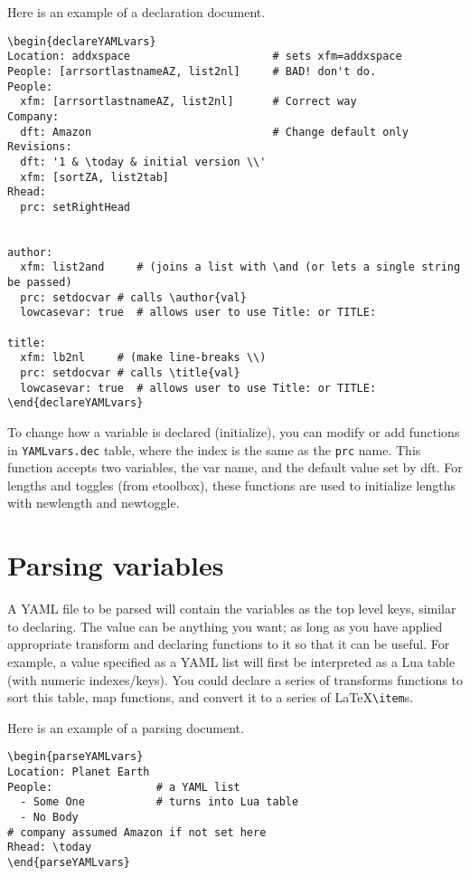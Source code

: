 \documentclass[11pt,parskip=half]{scrartcl}
\begin{document}
Here is an example of a declaration document.
\begin{verbatim}
\begin{declareYAMLvars}
Location: addxspace                      # sets xfm=addxspace
People: [arrsortlastnameAZ, list2nl]     # BAD! don't do.
People:
  xfm: [arrsortlastnameAZ, list2nl]      # Correct way
Company:
  dft: Amazon                            # Change default only
Revisions:
  dft: '1 & \today & initial version \\'
  xfm: [sortZA, list2tab]
Rhead:
  prc: setRightHead


author:
  xfm: list2and     # (joins a list with \and (or lets a single string be passed)
  prc: setdocvar # calls \author{val}
  lowcasevar: true  # allows user to use Title: or TITLE:
  
title:
  xfm: lb2nl     # (make line-breaks \\)
  prc: setdocvar # calls \title{val}
  lowcasevar: true  # allows user to use Title: or TITLE:
\end{declareYAMLvars}
\end{verbatim}


To change how a variable is declared (initialize), you can modify or add functions in
\texttt{YAMLvars.dec} table, where the index is the same as the \texttt{prc} name. 
This function accepts two variables, the var name, and the default value set by dft.
For lengths and toggles (from etoolbox), these functions are used to initialize lengths
with newlength and newtoggle.


\section{Parsing variables}
A YAML file to be parsed will contain the variables as the top level keys, similar to declaring.
The value can be anything you want; as long as you have applied appropriate transform and declaring
functions to it so that it can be useful. For example, a value specified as a YAML list will first be
interpreted as a Lua table (with numeric indexes/keys). You could declare a series of transforms functions
to sort this table, map functions, and convert it to a series of \LaTeX  \texttt{\textbackslash item}s.

Here is an example of a parsing document.


\begin{verbatim}
\begin{parseYAMLvars}
Location: Planet Earth
People:                # a YAML list
  - Some One           # turns into Lua table
  - No Body
# company assumed Amazon if not set here
Rhead: \today
\end{parseYAMLvars}
\end{verbatim}
\end{document}
